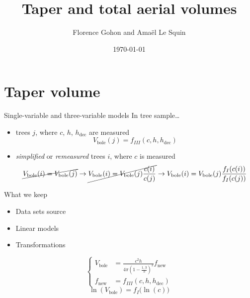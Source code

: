 \documentclass[sectiontocframe default=off, aspectratio=169]{beamer}
\title{Taper and total aerial volumes}
\date{\today}
\author{Florence Gohon and Amaël Le Squin}
\institute{Institut National de l'information géographique et forestière}
\newcommand{\fnew}{f_{\text{new}}}
\newcommand{\hdec}{h_{\text{dec}}}
\newcommand{\Vbft}{V_{\text{bole}}}
\begin{document}
\maketitle

\section{Taper volume}

\begin{frame}{Single-variable and three-variable models}
	In tree sample\ldots{}
	\begin{itemize}
		\item trees \( j \), where \( c \), \( h \), \( \hdec \) are measured
		\[
			\Vbft(j) = f_{III}(c, h, \hdec)
		\]
		\item \emph{simplified} or \emph{remeasured} trees \( i \), where \( c \) is measured
		\[
			\cancel{ \Vbft(i) = \Vbft(j) }
			\to
			\cancel{ \Vbft(i) = \Vbft(j) \frac{c(i)}{c(j)} }
			\to
			\Vbft(i) = \Vbft(j) \frac{f_{I}(c(i))}{f_{I}(c(j))}
		\]
	\end{itemize}
\end{frame}

\begin{frame}{What we keep}
	\begin{itemize}
		\item Data sets source
		\item Linear models
		\item Transformations
	\end{itemize}

\[
	\left\{
	\begin{aligned}
		\Vbft &= \frac{c^2 h}{4 \pi \left( 1 - \frac{1{,}3}{h} \right)^2} \fnew \\
		\fnew &= f_{III}(c, h, \hdec)
	\end{aligned}
	\right.
\]
\bigskip
\[
	\ln(\Vbft) = f_{I}\big( \ln(c) \big)
\]
\end{frame}
\end{document}
